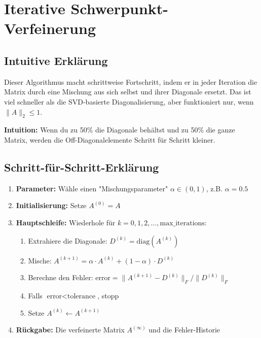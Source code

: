 \documentclass[a4paper,12pt]{article}
\begin{document}

\section{Iterative Schwerpunkt-Verfeinerung}

\subsection{Intuitive Erklärung}

Dieser Algorithmus macht schrittweise Fortschritt, indem er in jeder Iteration die Matrix durch eine Mischung aus sich selbst und ihrer Diagonale ersetzt. Das ist viel schneller als die SVD-basierte Diagonalisierung, aber funktioniert nur, wenn $\|A\|_2 \leq 1$.

\textbf{Intuition:} Wenn du zu 50\% die Diagonale behältst und zu 50\% die ganze Matrix, werden die Off-Diagonalelemente Schritt für Schritt kleiner.

\subsection{Schritt-für-Schritt-Erklärung}

\begin{enumerate}
\item \textbf{Parameter:} Wähle einen "Mischungsparameter" $\alpha \in (0, 1)$, z.B. $\alpha = 0.5$

\item \textbf{Initialisierung:} Setze $A^{(0)} = A$

\item \textbf{Hauptschleife:} Wiederhole für $k = 0, 1, 2, \ldots, \text{max\_iterations}$:

\begin{enumerate}
\item Extrahiere die Diagonale: $D^{(k)} = \text{diag}(A^{(k)})$

\item Mische: $A^{(k+1)} = \alpha \cdot A^{(k)} + (1-\alpha) \cdot D^{(k)}$

\item Berechne den Fehler: $\text{error} = \|A^{(k+1)} - D^{(k)}\|_F / \|D^{(k)}\|_F$

\item Falls $\text{error} < \text{tolerance}$, stopp

\item Setze $A^{(k)} \leftarrow A^{(k+1)}$
\end{enumerate}

\item \textbf{Rückgabe:} Die verfeinerte Matrix $A^{(\infty)}$ und die Fehler-Historie
\end{enumerate}
\end{document}
